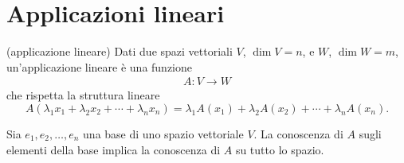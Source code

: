 \section{Applicazioni lineari}

\begin{definition}{(applicazione lineare)}
Dati due spazi vettoriali $V$, $\dim{V} = n$, e $W$, $\dim{W} = m$, un'applicazione lineare è una funzione 
\begin{align*}
A : V \longrightarrow W
\end{align*} 
che rispetta la struttura lineare
\begin{equation*}
A(\lambda_1 x_1 + \lambda_2 x_2 + \cdots + \lambda_n x_n) = \lambda_1 A(x_1) + \lambda_2 A(x_2) + \cdots + \lambda_n A(x_n).
\end{equation*}
\end{definition}
\begin{proposition}
Sia $e_1, e_2, \ldots, e_n$ una base di uno spazio vettoriale $V$. La conoscenza di $A$ sugli elementi della base implica la conoscenza di $A$ su tutto lo spazio.
\end{proposition}

